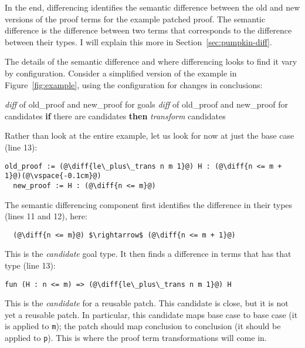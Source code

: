 In the end, differencing identifies the semantic difference between the old and new versions of the proof terms for the example patched proof.
The semantic difference is the difference between two terms that corresponds to the difference between their types.
I will explain this more in Section~\ref{sec:pumpkin-diff}.

The details of the semantic difference and where differencing looks to find it vary by configuration.
Consider a simplified version of the example in Figure~\ref{fig:example}, using the configuration for changes in conclusions:

\begin{algorithm}
\footnotesize
\begin{algorithmic}[1]
    \STATE \textit{diff}  of old\_proof and new\_proof for goals
    \STATE \textit{diff}  of old\_proof and new\_proof for candidates
    \STATE \textbf{if} there are candidates \textbf{then}
    \STATE \hspace*{1em} \textit{transform} candidates
\end{algorithmic}
\end{algorithm}
Rather than look at the entire example, let us look for now at just the base case (line 13):

\begin{lstlisting}[language=coq]
  old_proof := (@\diff{le\_plus\_trans n m 1}@) H : (@\diff{n <= m + 1}@)(@\vspace{-0.1cm}@)
  new_proof := H : (@\diff{n <= m}@)
\end{lstlisting}
The semantic differencing component first identifies the difference in their types (lines 11 and 12), here:

\begin{lstlisting}
  (@\diff{n <= m}@) $\rightarrow$ (@\diff{n <= m + 1}@)
\end{lstlisting}
This is the \textit{candidate} goal type.
It then finds a difference in terms that has that type (line 13):

\begin{lstlisting}[language=coq]
  fun (H : n <= m) => (@\diff{le\_plus\_trans n m 1}@) H
\end{lstlisting}
This is the \emph{candidate} for a reusable patch.
This candidate is close, but it is not yet a reusable patch. In particular, this candidate
maps base case to base case (it is applied to \lstinline{m}); the patch should map conclusion to conclusion (it should
be applied to \lstinline{p}).
This is where the proof term transformations will come in.

